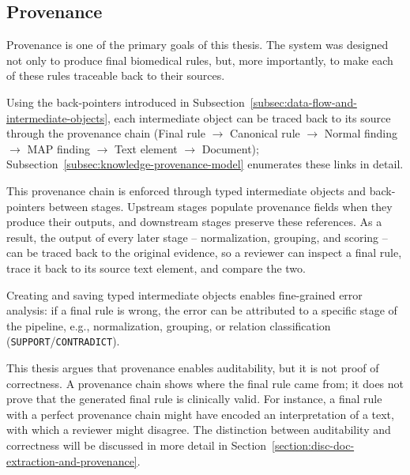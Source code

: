 \subsection{Provenance}\label{subsec:provenance}

Provenance is one of the primary goals of this thesis. The system was designed not only to produce final biomedical rules, but, more importantly, to make each of these rules traceable back to their sources. 

Using the back-pointers introduced in Subsection~\ref{subsec:data-flow-and-intermediate-objects}, each intermediate object can be traced back to its source through the provenance chain (Final rule $\rightarrow$ Canonical rule $\rightarrow$ Normal finding $\rightarrow$ MAP finding $\rightarrow$ Text element $\rightarrow$ Document); Subsection~\ref{subsec:knowledge-provenance-model} enumerates these links in detail.

This provenance chain is enforced through typed intermediate objects and back-pointers between stages. Upstream stages populate provenance fields when they produce their outputs, and downstream stages preserve these references. As a result, the output of every later stage -- normalization, grouping, and scoring -- can be traced back to the original evidence, so a reviewer can inspect a final rule, trace it back to its source text element, and compare the two.

Creating and saving typed intermediate objects enables fine-grained error analysis: if a final rule is wrong, the error can be attributed to a specific stage of the pipeline, e.g., normalization, grouping, or relation classification (\texttt{SUPPORT}/\texttt{CONTRADICT}).

This thesis argues that provenance enables auditability, but it is not proof of correctness. A provenance chain shows where the final rule came from; it does not prove that the generated final rule is clinically valid. For instance, a final rule with a perfect provenance chain might have encoded an interpretation of a text, with which a reviewer might disagree. The distinction between auditability and correctness will be discussed in more detail in Section~\ref{section:disc-doc-extraction-and-provenance}.